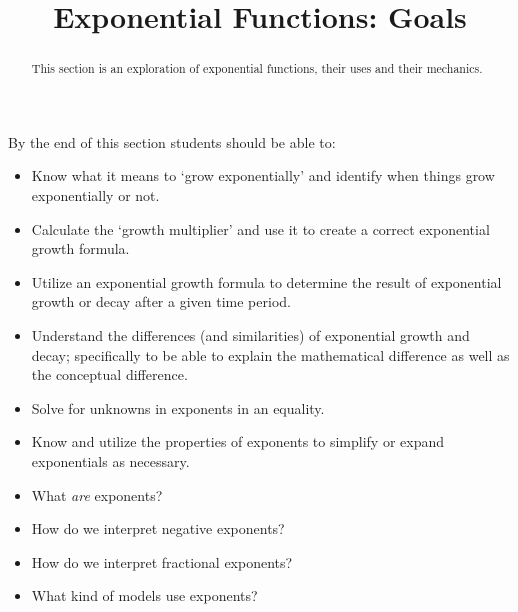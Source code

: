 \documentclass{ximera}
\title{Exponential Functions: Goals}
\begin{document}
\begin{abstract}
This section is an exploration of exponential functions, their uses and their mechanics.
\end{abstract}
\maketitle
By the end of this section students should be able to:

\begin{itemize}
    \item Know what it means to `grow exponentially' and identify when things grow exponentially or not.
    \item Calculate the `growth multiplier' and use it to create a correct exponential growth formula.
    \item Utilize an exponential growth formula to determine the result of exponential growth or decay after a given time period.
    \item Understand the differences (and similarities) of exponential growth and decay; specifically to be able to explain the mathematical difference as well as the conceptual difference.
    \item Solve for unknowns in exponents in an equality.
    \item Know and utilize the properties of exponents to simplify or expand exponentials as necessary.
\end{itemize}

\begin{itemize}
    \item What \textit{are} exponents?
    \item How do we interpret negative exponents?
    \item How do we interpret fractional exponents?
    \item What kind of models use exponents?
\end{itemize}
\end{document}
